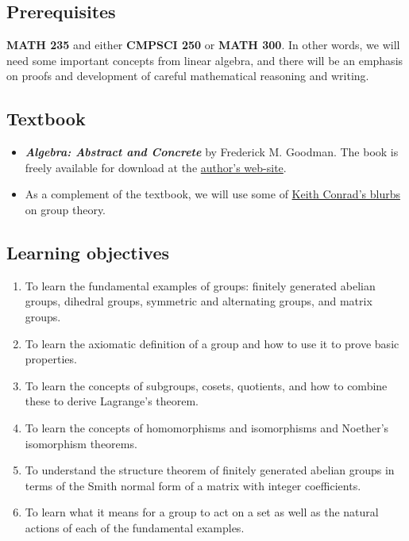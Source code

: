 \documentclass[11pt]{article}
\begin{document}
\subsection*{Prerequisites}
\label{sec:org1b93b3b}
\textbf{MATH 235} and either \textbf{CMPSCI 250} or \textbf{MATH 300}. In other words, we will need
some important concepts from linear algebra, and there will be an emphasis on
proofs and development of careful mathematical reasoning and writing.

\subsection*{Textbook}
\label{sec:org99c3462}
\begin{itemize}
\item \textbf{\emph{Algebra: Abstract and Concrete}} by Frederick M. Goodman. The book is
freely available for download at the \href{https://homepage.divms.uiowa.edu/\~goodman/algebrabook.dir/algebrabook.html}{author's web-site}.
\item As a complement of the textbook, we will use some of \href{https://kconrad.math.uconn.edu/blurbs/}{Keith Conrad's blurbs} on
group theory.
\end{itemize}

\subsection*{Learning objectives}
\label{sec:org5a70151}

\begin{enumerate}
\item To learn the fundamental examples of groups: finitely generated abelian
groups, dihedral groups, symmetric and alternating groups, and matrix
groups.
\item To learn the axiomatic definition of a group and how to use it to prove
basic properties.
\item To learn the concepts of subgroups, cosets, quotients, and how to combine
these to derive Lagrange’s theorem.
\item To learn the concepts of homomorphisms and isomorphisms and Noether's
isomorphism theorems.
\item To understand the structure theorem of finitely generated abelian groups in
terms of the Smith normal form of a matrix with integer coefficients.
\item To learn what it means for a group to act on a set as well as the
natural actions of each of the fundamental examples.
\end{enumerate}
\end{document}
